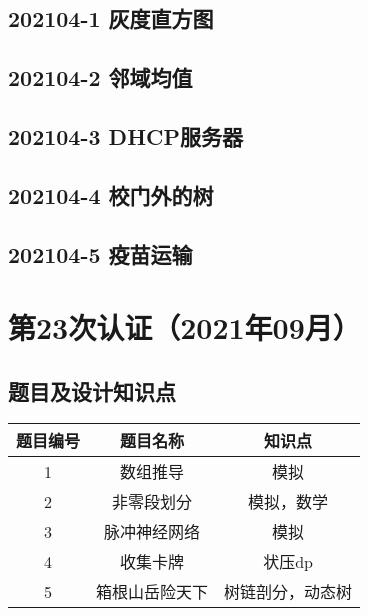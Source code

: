 \documentclass[cn,10pt,math=newtx,citestyle=gb7714-2015,bibstyle=gb7714-2015]{elegantbook}
\newif\ifonlyanalyze %
\begin{document}
\newpage
\section{202104-1 灰度直方图}
\ifonlyanalyze
\else
  
\fi


\newpage
\section{202104-2 邻域均值}
\ifonlyanalyze
\else
  
\fi


\newpage
\section{202104-3 DHCP服务器}
\ifonlyanalyze
\else
  
\fi


\newpage
\section{202104-4 校门外的树}
\ifonlyanalyze
\else
  
\fi


\newpage
\section{202104-5 疫苗运输}
\ifonlyanalyze
\else
  
\fi



\chapter{第23次认证（2021年09月）}

\section{题目及设计知识点}

\begin{table}[htbp]
  \centering
  \begin{tabular}{ccc}
    \toprule
    题目编号 & 题目名称       & 知识点           \\
    \midrule
    1        & 数组推导       & 模拟             \\
    2        & 非零段划分     & 模拟，数学       \\
    3        & 脉冲神经网络   & 模拟             \\
    4        & 收集卡牌       & 状压dp           \\
    5        & 箱根山岳险天下 & 树链剖分，动态树 \\
    \bottomrule
  \end{tabular}
\end{table}
\end{document}

